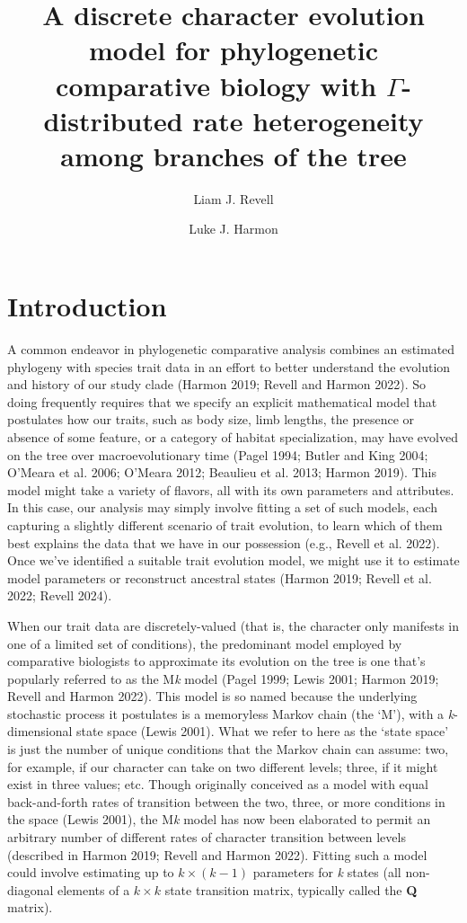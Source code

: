 \documentclass[fleqn,10pt,lineno]{wlpeerj} %
\title{A discrete character evolution model for phylogenetic comparative biology with \(\Gamma\)-distributed rate heterogeneity among branches of the tree}
\author[1, 2]{Liam J. Revell}
\author[3]{Luke J. Harmon}
\affil[1]{Department of Biology, University of Massachusetts Boston, Boston, MA, USA}
\affil[2]{Facultad de Ciencias, Universidad Católica de la Santísima Concepción, Concepción, Chile}
\affil[3]{Department of Biological Sciences, Institute for Bioinformatics and Evolutionary Studies (IBEST), University of Idaho, Moscow, ID, USA}
\begin{document}
\flushbottom
\maketitle
\thispagestyle{empty}

\section{Introduction}\label{introduction}

A common endeavor in phylogenetic comparative analysis combines an estimated phylogeny with species trait data in an effort to better understand the evolution and history of our study clade (Harmon 2019; Revell and Harmon 2022). So doing frequently requires that we specify an explicit mathematical model that postulates how our traits, such as body size, limb lengths, the presence or absence of some feature, or a category of habitat specialization, may have evolved on the tree over macroevolutionary time (Pagel 1994; Butler and King 2004; O'Meara et al. 2006; O'Meara 2012; Beaulieu et al. 2013; Harmon 2019). This model might take a variety of flavors, all with its own parameters and attributes. In this case, our analysis may simply involve fitting a set of such models, each capturing a slightly different scenario of trait evolution, to learn which of them best explains the data that we have in our possession (e.g., Revell et al. 2022). Once we've identified a suitable trait evolution model, we might use it to estimate model parameters or reconstruct ancestral states (Harmon 2019; Revell et al. 2022; Revell 2024).

When our trait data are discretely-valued (that is, the character only manifests in one of a limited set of conditions), the predominant model employed by comparative biologists to approximate its evolution on the tree is one that's popularly referred to as the M\emph{k} model (Pagel 1999; Lewis 2001; Harmon 2019; Revell and Harmon 2022). This model is so named because the underlying stochastic process it postulates is a memoryless Markov chain (the `M'), with a \emph{k}-dimensional state space (Lewis 2001). What we refer to here as the `state space' is just the number of unique conditions that the Markov chain can assume: two, for example, if our character can take on two different levels; three, if it might exist in three values; etc. Though originally conceived as a model with equal back-and-forth rates of transition between the two, three, or more conditions in the space (Lewis 2001), the M\emph{k} model has now been elaborated to permit an arbitrary number of different rates of character transition between levels (described in Harmon 2019; Revell and Harmon 2022). Fitting such a model could involve estimating up to \(k \times (k-1)\) parameters for \emph{k} states (all non-diagonal elements of a \(k \times k\) state transition matrix, typically called the \textbf{Q} matrix).
\end{document}

